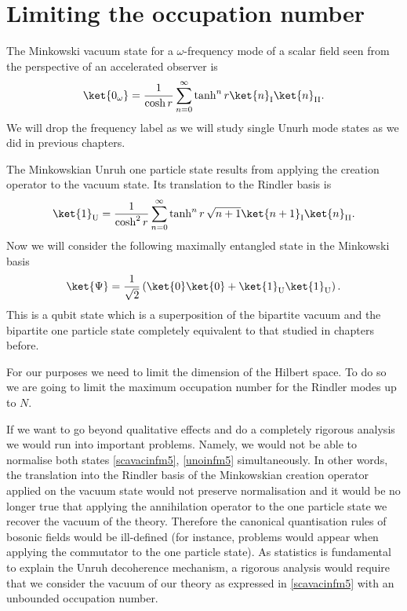 \section{Limiting the occupation number}\label{sec3}

The Minkowski vacuum state for a $\omega$-frequency mode of a scalar field seen from the perspective of an accelerated observer is
\begin{equation}\label{scavacinfm5}
\ket{0_\omega}=\frac{1}{\cosh r}\sum_{n=0}^\infty \tanh^n r \ket{n}_{\text{I}}\ket{n}_{\text{II}}.
\end{equation}
We will drop the frequency label as we will study single Unurh mode states as we did in previous chapters.

The Minkowskian Unruh one particle state results from applying the creation operator to the vacuum state. Its translation to the Rindler basis is
\begin{equation}\label{unoinfm5}
\ket{1}_\text{U}=\frac{1}{\cosh^2 r}\sum_{n=0}^{\infty} \tanh^n r \,\sqrt{n+1}\ket{n+1}_{\text{I}}\ket{n}_{\text{II}}.
\end{equation} 	
Now we will consider the following maximally entangled state in the Minkowski basis
\begin{equation}
\label{entangledscainf}\ket{\Psi}=\frac{1}{\sqrt{2}}\left(\ket{0}\ket{0}+\ket{1}_\text{U}\ket{1}_\text{U}\right).
\end{equation}
This is a qubit state which is a superposition of the bipartite vacuum and the bipartite one particle state completely equivalent to that studied in chapters before. 

For our purposes we need to limit the dimension of the Hilbert space. To do so we are going to limit the maximum occupation number for the Rindler modes up to $N$.

If we want to go beyond qualitative effects and do a completely rigorous analysis we would run into important problems. Namely, we would not be able to normalise both states  \eqref{scavacinfm5}, \eqref{unoinfm5} simultaneously. In other words, the translation into the Rindler basis of the Minkowskian creation operator applied on the vacuum state would not preserve normalisation and it would be no longer true that applying the annihilation operator to the one particle state we recover the vacuum of the theory. Therefore the canonical quantisation rules of bosonic fields would be ill-defined (for instance, problems would appear when applying the commutator to the one particle state). As statistics is fundamental to explain the Unruh decoherence mechanism, a rigorous analysis would require that we consider the vacuum of our theory as expressed in \eqref{scavacinfm5} with an unbounded occupation number.

